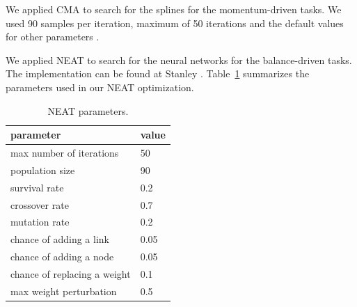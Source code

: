 We applied CMA to search for the splines for the momentum-driven tasks. We used 90 samples per iteration, maximum of 50 iterations and the default values for other parameters \cite{Hensen:2006}.

We applied NEAT to search for the neural networks for the balance-driven tasks. The implementation can be found at Stanley \cite{Stanley:2002}. Table~\ref{table:NEATParameters} summarizes the parameters used in our NEAT optimization.

\begin{table}[ht]
\vspace{-0.1in}
\centering
\begin{tabular}{|l|l|}
\hline
parameter & value \\
\hline
max number of iterations & 50\\
population size & 90 \\
survival rate & 0.2\\
crossover rate & 0.7 \\
mutation rate & 0.2\\
chance of adding a link & 0.05\\
chance of adding a node	& 0.05\\
chance of replacing a weight & 0.1\\
max weight perturbation & 0.5\\
\hline
\end{tabular}
\caption{NEAT parameters. }
\label{table:NEATParameters}
\end{table}

